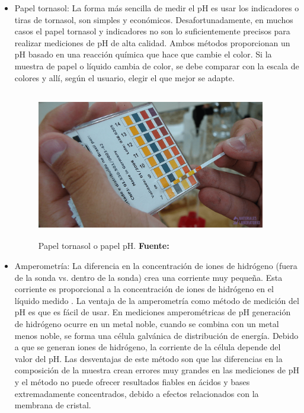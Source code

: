 \begin{itemize}
    \item Papel tornasol: La forma más sencilla de medir el pH es usar los indicadores o tiras de tornasol, son simples y económicos. 
    Desafortunadamente, en muchos casos el papel tornasol y indicadores no son lo suficientemente precisos para realizar mediciones de pH de alta calidad. 
    Ambos métodos proporcionan un pH basado en una reacción química que hace que cambie el color. 
    Si la muestra de papel o líquido cambia de color, se debe comparar con la escala de colores y allí, según el usuario, elegir el que mejor se adapte.
    
    \begin{figure}[ht]
        \centering
        \includegraphics[width=100mm, height=65mm]{Imagenes/cap2/Papel-tornasol-min.png}
        \caption {Papel tornasol o papel pH. \textbf{Fuente:} \cite{noauthor_papel-tornasol-min-768x432png_nodate} }
        \label{fig:tornasol}
    \end{figure}
    
    \item Amperometría: La diferencia en la concentración de iones de hidrógeno (fuera de la sonda vs. dentro de la sonda) crea una corriente muy pequeña. 
    Esta corriente es proporcional a la concentraci\'on de iones de hidrógeno en el líquido medido \cite{Atlas_pH}. 
    La ventaja de la amperometría como método de medición del pH es que es fácil de usar. 
    En mediciones amperométricas de pH generación de hidrógeno ocurre en un metal noble, cuando se combina con un metal menos noble, se forma una c\'elula galvánica de distribución de energía. 
    Debido a que se generan iones de hidrógeno, la corriente de la c\'elula depende del valor del pH. 
    Las desventajas de este método son que las diferencias en la composición de la muestra crean errores muy grandes en las mediciones de pH y el método no puede ofrecer resultados fiables en ácidos y bases extremadamente concentrados, debido a efectos relacionados con la membrana de cristal. 
    

\end{itemize}
